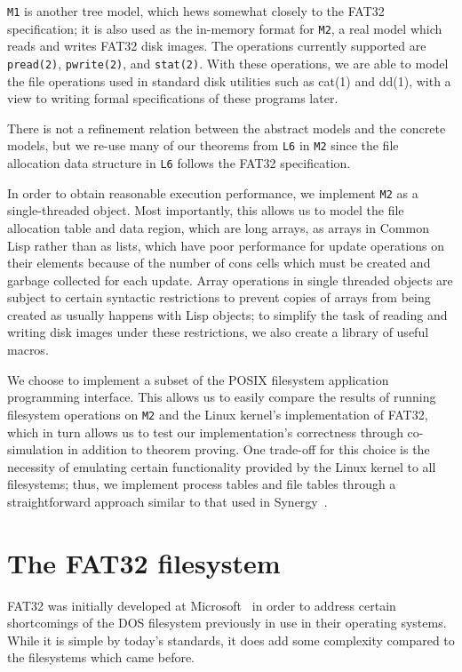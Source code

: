 \documentclass[submission,copyright,creativecommons]{eptcs}
\begin{document}
\texttt{M1} is another tree model, which hews somewhat closely to the
FAT32 specification; it is also used as the in-memory format for
\texttt{M2}, a real model which reads and writes FAT32 disk
images. The operations currently supported are \texttt{pread(2)},
\texttt{pwrite(2)}, and \texttt{stat(2)}. With these operations, we
are able to model the file operations used in standard disk utilities
such as cat(1) and dd(1), with a view to writing formal specifications
of these programs later.

There is not a refinement relation between the abstract models and the
concrete models, but we re-use many of our theorems from \texttt{L6}
in \texttt{M2} since the file allocation data structure in \texttt{L6}
follows the FAT32 specification.

In order to obtain reasonable execution performance, we implement
\texttt{M2} as a single-threaded object. Most importantly, this allows
us to model the file allocation table and data region, which are long
arrays, as arrays in Common Lisp rather than as lists, which have poor
performance for update operations on their elements because of the
number of cons cells which must be created and garbage collected for
each update. Array operations in single threaded objects are subject
to certain syntactic restrictions to prevent copies of arrays from
being created as usually happens with Lisp objects; to simplify the
task of reading and writing disk images under these restrictions, we
also create a library of useful macros.

We choose to implement a subset of the POSIX filesystem application
programming interface. This allows us to easily compare the results of
running filesystem operations on \texttt{M2} and the Linux kernel's
implementation of FAT32, which in turn allows us to test our
implementation's correctness through co-simulation in addition to
theorem proving. One trade-off for this choice is the necessity of
emulating certain functionality provided by the Linux kernel to all
filesystems; thus, we implement process tables and file tables through
a straightforward approach similar to that used in
Synergy~\cite{bevier1996executable}.

\section{The FAT32 filesystem}

FAT32 was initially developed at Microsoft~\cite{microsoft2000} in
order to address certain shortcomings of the DOS filesystem previously
in use in their operating systems. While it is simple by today's
standards, it does add some complexity compared to the filesystems
which came before.
\end{document}
